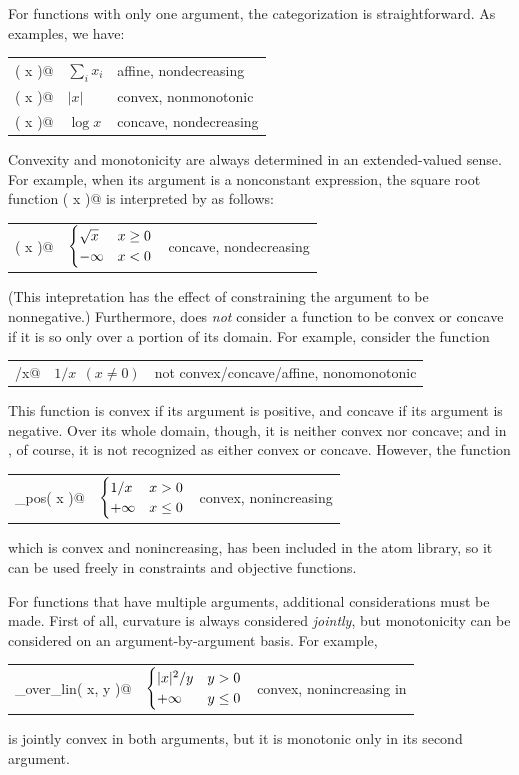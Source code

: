 \documentclass[12pt]{article}
\begin{document}
For functions with only one argument, the categorization is 
straightforward.  As examples, we have:
\begin{center}
\begin{tabular}{lll}
	\verb@sum( x )@ & $\sum_i x_i$ & affine, nondecreasing \\
	\verb@abs( x )@ & $|x|$ & convex, nonmonotonic \\
	\verb@log( x )@ & $\log x$ & concave, nondecreasing
\end{tabular}
\end{center}
Convexity and monotonicity are always determined in an 
extended-valued sense.
For example, when its argument is a nonconstant
\cvx expression, the square root function \verb@sqrt( x )@ is
interpreted by \cvx as follows:
\begin{center}
\begin{tabular}{lll}
	\verb@sqrt( x )@ & $\begin{cases} \sqrt{x}&x\geq 0\\-\infty&x<0 \end{cases}$ & concave, nondecreasing \\
\end{tabular}
\end{center}
(This intepretation has the effect of constraining the argument \verb@x@
to be nonnegative.) Furthermore, \cvx does \emph{not} consider a function to be
convex or concave if it is so only over a portion of its domain. 
For example, consider the function
\begin{center}
\begin{tabular}{lll}
	\verb@1/x@ & $1/x~~(x\neq 0)$ & not convex/concave/affine, nonomonotonic
\end{tabular}
\end{center}
This function is convex if its argument is positive, and
concave if its argument is negative.  Over its whole domain, though,
it is neither convex nor concave;
and in \cvx, of course, it is not recognized as either convex or 
concave.
However, the function
\begin{center}
\begin{tabular}{lll}
	\verb@inv_pos( x )@ & $\begin{cases} 1/x &x>0\\+\infty&x\leq 0 \end{cases}$ & convex, nonincreasing
\end{tabular}
\end{center}
which is convex and nonincreasing,
has been included in the atom library,
so it can be used freely in constraints
and objective functions.

For functions that have multiple arguments, additional considerations must
be made. First of all, curvature is always considered \emph{jointly}, but monotonicity
can be considered on an argument-by-argument basis. For example,
\begin{center}
\begin{tabular}{lll}
	\verb@quad_over_lin( x, y )@ & $\begin{cases} |x|^2/y&y> 0\\+\infty&y\leq 0 \end{cases}$ & convex, nonincreasing in \verb@y@
\end{tabular}
\end{center}
is jointly convex in both arguments, but it is monotonic 
only in its second argument.
\end{document}
